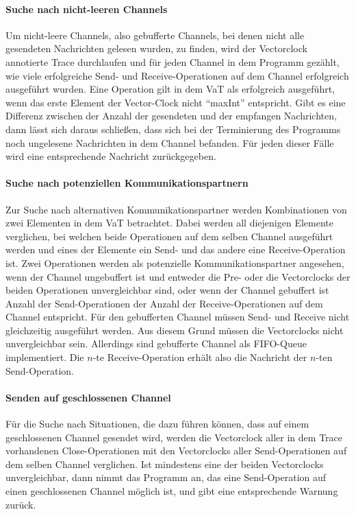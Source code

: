 \paragraph{Suche nach nicht-leeren Channels} 
Um nicht-leere Channels, also gebufferte Channels, bei denen nicht alle 
gesendeten Nachrichten gelesen wurden, zu finden, wird der Vectorclock annotierte
Trace durchlaufen und für jeden Channel in dem Programm gezählt, wie viele 
erfolgreiche Send- und Receive-Operationen auf dem Channel erfolgreich ausgeführt 
wurden. Eine Operation gilt in dem VaT als erfolgreich ausgeführt, wenn 
das erste Element der Vector-Clock nicht ``maxInt'' entspricht. Gibt es 
eine Differenz zwischen der Anzahl der gesendeten und der empfangen Nachrichten, 
dann lässt sich daraus schließen, dass sich bei der Terminierung des 
Programms noch ungelesene Nachrichten in dem Channel befanden.
Für jeden dieser Fälle wird eine entsprechende Nachricht zurückgegeben. 

\paragraph{Suche nach potenziellen Kommunikationspartnern}
Zur Suche nach alternativen Kommunikationspartner werden Kombinationen
von zwei Elementen in dem VaT betrachtet. Dabei werden all diejenigen 
Elemente verglichen, bei welchen beide Operationen auf dem selben Channel 
ausgeführt werden und eines der 
Elemente ein Send- und das andere eine Receive-Operation ist. Zwei Operationen
werden als potenzielle Kommunikationspartner angesehen, wenn der Channel 
ungebuffert ist und entweder die Pre- oder die Vectorclocks der beiden 
Operationen unvergleichbar sind, oder wenn der Channel gebuffert ist
Anzahl der Send-Operationen der Anzahl der Receive-Operationen auf dem Channel 
entspricht. Für den gebufferten Channel müssen Send- und Receive nicht 
gleichzeitig ausgeführt werden. Aus diesem Grund müssen die Vectorclocks 
nicht unvergleichbar sein. Allerdings sind gebufferte Channel als FIFO-Queue 
implementiert. Die $n$-te Receive-Operation erhält also die Nachricht der 
$n$-ten Send-Operation.

\paragraph{Senden auf geschlossenen Channel}
Für die Suche nach Situationen, die dazu führen können, dass auf einem 
geschlossenen Channel gesendet wird, werden die Vectorclock aller in dem 
Trace vorhandenen Close-Operationen mit den Vectorclocks aller Send-Operationen
auf dem selben Channel verglichen. Ist mindestens eine der beiden Vectorclocks 
unvergleichbar, dann nimmt das Programm an, das eine Send-Operation auf 
einen geschlossenen Channel möglich ist, und gibt eine entsprechende 
Warnung zurück.

